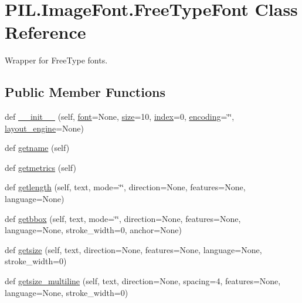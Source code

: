 \hypertarget{classPIL_1_1ImageFont_1_1FreeTypeFont}{}\section{P\+I\+L.\+Image\+Font.\+Free\+Type\+Font Class Reference}
\label{classPIL_1_1ImageFont_1_1FreeTypeFont}


Wrapper for Free\+Type fonts.  


\subsection*{Public Member Functions}
\begin{DoxyCompactItemize}
\item 
def \hyperlink{classPIL_1_1ImageFont_1_1FreeTypeFont_aeff15ef6679ee17ff54bcdef951aeb39}{\+\_\+\+\_\+init\+\_\+\+\_\+} (self, \hyperlink{classPIL_1_1ImageFont_1_1FreeTypeFont_a85ce93d3087fb6dd43ae45b408880304}{font}=None, \hyperlink{classPIL_1_1ImageFont_1_1FreeTypeFont_a3f697fceb4923e030d9ef050648cd065}{size}=10, \hyperlink{classPIL_1_1ImageFont_1_1FreeTypeFont_a7fdae09aca4e12612ee730ae2667804f}{index}=0, \hyperlink{classPIL_1_1ImageFont_1_1FreeTypeFont_afeaea61a78a2a32629875ec53edf8596}{encoding}=\char`\"{}\char`\"{}, \hyperlink{classPIL_1_1ImageFont_1_1FreeTypeFont_a05fc99625547b1cc0b20944f66909591}{layout\+\_\+engine}=None)
\item 
def \hyperlink{classPIL_1_1ImageFont_1_1FreeTypeFont_af1a913610fd7db5aea56f88c0893f0b6}{getname} (self)
\item 
def \hyperlink{classPIL_1_1ImageFont_1_1FreeTypeFont_a111588ddc57c15c0e018c24509d8a9ba}{getmetrics} (self)
\item 
def \hyperlink{classPIL_1_1ImageFont_1_1FreeTypeFont_a712468926539e605d8fb234fea7c9db4}{getlength} (self, text, mode=\char`\"{}\char`\"{}, direction=None, features=None, language=None)
\item 
def \hyperlink{classPIL_1_1ImageFont_1_1FreeTypeFont_a335212b091da8399d82f685476af9caf}{getbbox} (self, text, mode=\char`\"{}\char`\"{}, direction=None, features=None, language=None, stroke\+\_\+width=0, anchor=None)
\item 
def \hyperlink{classPIL_1_1ImageFont_1_1FreeTypeFont_abf6ab8899318de445cd88bf1cd01a961}{getsize} (self, text, direction=None, features=None, language=None, stroke\+\_\+width=0)
\item 
def \hyperlink{classPIL_1_1ImageFont_1_1FreeTypeFont_a7b763fb0d4e667abcc91eb4ee193d783}{getsize\+\_\+multiline} (self, text, direction=None, spacing=4, features=None, language=None, stroke\+\_\+width=0)

\end{DoxyCompactItemize}
